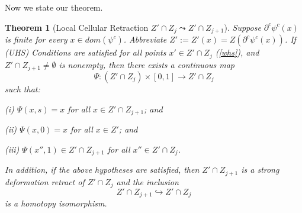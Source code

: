 \documentclass[12pt]{amsart}
\newtheorem{thm}{Theorem}
\theoremstyle{definition}
\theoremstyle{remark}
\newcommand{\bR}{\mathbb{R}}
\newcommand{\del}{\partial}
\newcommand{\sub}{\del^c \psi^c(x')}
\newcommand{\cd}{c_\Delta}
\begin{document}













Now we state our theorem.
\begin{thm}[Local Cellular Retraction 
$Z'\cap Z_j \leadsto Z' \cap Z_{j+1}$]


Suppose $\del^c \psi^c(x)$ is finite for every $x\in dom(\psi^c)$. Abbreviate $Z':=Z'(x)=Z(\del^c \psi^c(x))$. If (UHS) Conditions are satisfied for all points $x' \in Z' \cap Z_j$ (\ref{whs}), and $Z' \cap Z_{j+1} \neq \emptyset$ is nonempty, then there exists a continuous map $$\Psi: (Z' \cap Z_j) \times [0,1] \to Z' \cap Z_j $$ 
such that:

(i) $\Psi(x,s)=x$ for all $x \in Z' \cap Z_{j+1}$; and

(ii) $\Psi(x,0)=x$ for all $x\in Z'$; and 

(iii) $\Psi(x'',1) \in Z' \cap Z_{j+1}$ for all $x'' \in Z' \cap Z_j$.

In addition, if the above hypotheses are satisfied, then $Z'\cap Z_{j+1}$ is a strong deformation retract of $Z' \cap Z_j$ and the inclusion $$Z'\cap Z_{j+1} \hookrightarrow Z'\cap Z_j$$ is a homotopy isomorphism.
\label{retract1} 
\end{thm}
\end{document}
